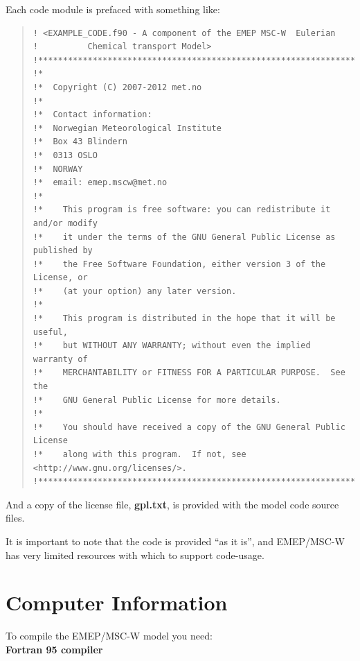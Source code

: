 Each code module is prefaced with something like:
\begin{quote}
\begin{small}
\begin{verbatim}
! <EXAMPLE_CODE.f90 - A component of the EMEP MSC-W  Eulerian
!          Chemical transport Model>
!*****************************************************************************!
!*
!*  Copyright (C) 2007-2012 met.no
!*
!*  Contact information:
!*  Norwegian Meteorological Institute
!*  Box 43 Blindern
!*  0313 OSLO
!*  NORWAY
!*  email: emep.mscw@met.no
!*
!*    This program is free software: you can redistribute it and/or modify
!*    it under the terms of the GNU General Public License as published by
!*    the Free Software Foundation, either version 3 of the License, or
!*    (at your option) any later version.
!*
!*    This program is distributed in the hope that it will be useful,
!*    but WITHOUT ANY WARRANTY; without even the implied warranty of
!*    MERCHANTABILITY or FITNESS FOR A PARTICULAR PURPOSE.  See the
!*    GNU General Public License for more details.
!*
!*    You should have received a copy of the GNU General Public License
!*    along with this program.  If not, see <http://www.gnu.org/licenses/>.
!*****************************************************************************!
\end{verbatim}
\end{small}
\end{quote}
And a copy of the license file, {\bf gpl.txt}, is provided with the
model code source files.

\noindent It is important to note that the code is provided ``as it is'', 
and EMEP/MSC-W has very limited resources with which to support
code-usage. 


\newpage

\section{Computer Information}
\label{sec:compinf}

To compile the EMEP/MSC-W model you need:\\

\textbf{Fortran 95 compiler}

